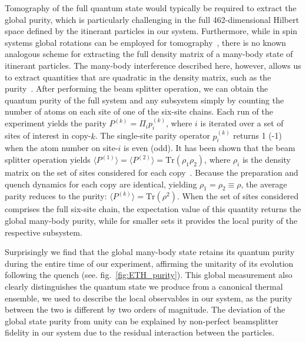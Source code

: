 Tomography of the full quantum state would typically be required to extract the global purity, which is particularly challenging in the full 462-dimensional Hilbert space defined by the itinerant particles in our system. Furthermore, while in spin systems global rotations can be employed for tomography~\cite{Sackett2000}, there is no known analogous scheme for extracting the full density matrix of a many-body state of itinerant particles. The many-body interference described here, however, allows us to extract quantities that are quadratic in the density matrix, such as the purity~\cite{Islam2015}. After performing the beam splitter operation, we can obtain the quantum purity of the full system and any subsystem simply by counting the number of atoms on each site of one of the six-site chains. Each run of the experiment yields the parity $P^{(k)} = \Pi_i p^{(k)}_i$, where $i$ is iterated over a set of sites of interest in copy-$k$. The single-site parity operator $p^{(k)}_i$ returns 1 (-1) when the atom number on site-$i$ is even (odd). It has been shown that the beam splitter operation yields $\langle P^{(1)} \rangle = \langle P^{(2)} \rangle = \mathrm{Tr}\left (\rho_1 \rho_2  \right)$, where $\rho_i$ is the density matrix on the set of sites considered for each copy~\cite{JakschPRA, Daley2012,Islam2015}. Because the preparation and quench dynamics for each copy are identical, yielding $\rho_1 = \rho_2 \equiv \rho$, the average parity reduces to the purity: $\langle P^{(k)} \rangle = \mathrm{Tr}(\rho^2)$. When the set of sites considered comprises the full six-site chain, the expectation value of this quantity returns the global many-body purity, while for smaller sets it provides the local purity of the respective subsystem.

Surprisingly we find that the global many-body state retains its quantum purity during the entire time of our experiment, affirming the unitarity of its evolution following the quench (see. fig.~\ref{fig:ETH_purity}). This global measurement also clearly distinguishes the quantum state we produce from a canonical thermal ensemble, we used to describe the local observables in our system, as the purity between the two is different by two orders of magnitude. The deviation of the global state purity from unity can be explained by non-perfect beamsplitter fidelity in our system due to the residual interaction between the particles.

